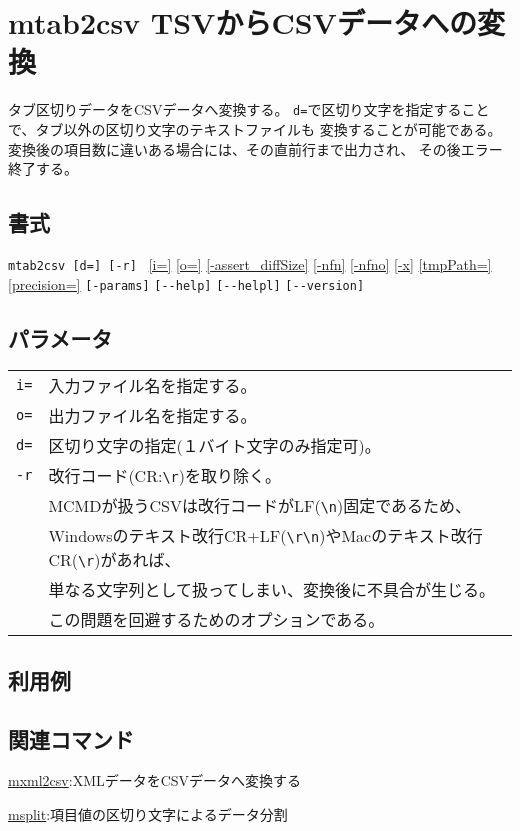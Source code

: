 
%

\section{mtab2csv TSVからCSVデータへの変換\label{sect:mtab2csv}}
タブ区切りデータをCSVデータへ変換する。
\verb|d=|で区切り文字を指定することで、タブ以外の区切り文字のテキストファイルも
変換することが可能である。 
変換後の項目数に違いある場合には、その直前行まで出力され、
その後エラー終了する。


\subsection*{書式}
\verb|mtab2csv [d=] [-r] |
\hyperref[sect:option_i]{[i=]}
\hyperref[sect:option_o]{[o=]}
\hyperref[sect:option_assert_diffSize]{[-assert\_diffSize]}
\hyperref[sect:option_nfn]{[-nfn]} 
\hyperref[sect:option_nfno]{[-nfno]}  
\hyperref[sect:option_x]{[-x]}
\hyperref[sect:option_option_tmppath]{[tmpPath=]}
\hyperref[sect:option_precision]{[precision=]}
\verb|[-params]|
\verb|[--help]|
\verb|[--helpl]|
\verb|[--version]|\\

\subsection*{パラメータ}
\begin{table}[htbp]
{\small
\begin{tabular}{ll}
\verb|i=|    & 入力ファイル名を指定する。\\
\verb|o=|    & 出力ファイル名を指定する。\\
\verb|d=|    & 区切り文字の指定(１バイト文字のみ指定可)。\\
\verb|-r|    & 改行コード(CR:\verb|\r|)を取り除く。\\
             & MCMDが扱うCSVは改行コードがLF(\verb|\n|)固定であるため、\\
             & Windowsのテキスト改行CR+LF(\verb|\r\n|)やMacのテキスト改行CR(\verb|\r|)があれば、\\
             & 単なる文字列として扱ってしまい、変換後に不具合が生じる。\\
             & この問題を回避するためのオプションである。\\
\end{tabular} 
}
\end{table} 

\subsection*{利用例}

\subsection*{関連コマンド}
\hyperref[sect:mxml2csv]{mxml2csv}:XMLデータをCSVデータへ変換する

\hyperref[sect:msplit]{msplit}:項目値の区切り文字によるデータ分割
%
